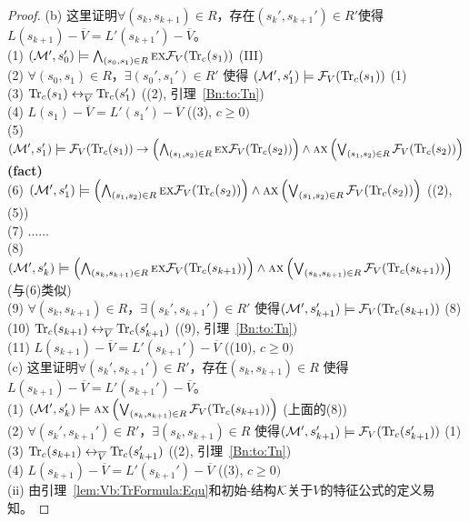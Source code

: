 \begin{proof}
	(b) 这里证明$\forall (s_k, s_{k+1}) \in R$，存在$(s_k', s_{k+1}') \in R'$使得$L(s_{k+1}) - \overline V = L'(s_{k+1}') - \overline V$。\\
	(1) $({\cal M}', s_0') \models \bigwedge_{(s_0, s_1) \in R} \textsc{e} \textsc{x} {\cal F}_V(\textrm{Tr}_c(s_1))$  \hfill  (III)\\
	(2) $\forall (s_0, s_1) \in R$，$\exists (s_0', s_1') \in R'$ 使得 $({\cal M}', s_1') \models {\cal F}_V(\textrm{Tr}_c(s_1))$  \hfill  (1)\\
	(3) $\textrm{Tr}_c(s_1) \leftrightarrow_{\overline V} \textrm{Tr}_c(s_1')$  \hfill  ((2), 引理~\ref{Bn:to:Tn}) \\
	(4) $L(s_1) - \overline V = L'(s_1') - \overline V$  \hfill   ((3), $c \geq 0)$\\
	(5) $({\cal M}', s_1') \models {\cal F}_V(\textrm{Tr}_c(s_1)) \rightarrow \left(\bigwedge_{(s_1,s_2)\in R} \textsc{e} \textsc{x} {\cal F}_V(\textrm{Tr}_c(s_2))\right) \wedge \textsc{a} \textsc{x} \left(\bigvee_{(s_1,s_2)\in R} {\cal F}_V(\textrm{Tr}_c(s_2))\right)$     \hfill  \textbf{(fact)}\\
	(6) $({\cal M}', s_1') \models \left(\bigwedge_{(s_1,s_2)\in R} \textsc{e} \textsc{x} {\cal F}_V(\textrm{Tr}_c(s_2))\right) \wedge \textsc{a} \textsc{x} \left(\bigvee_{(s_1,s_2)\in R} {\cal F}_V(\textrm{Tr}_c(s_2))\right)$ \hfill ((2), (5))\\
	(7) $\dots \dots$ \\
	(8) $({\cal M}', s_k') \models \left(\bigwedge_{(s_k,s_{k+1})\in R} \textsc{e} \textsc{x} {\cal F}_V(\textrm{Tr}_c(s_{k+1}))\right) \wedge \textsc{a} \textsc{x} \left(\bigvee_{(s_k,s_{k+1})\in R} {\cal F}_V(\textrm{Tr}_c(s_{k+1}))\right)$       \hfill (与(6)类似)\\
	(9) $\forall (s_k, s_{k+1}) \in R$，$\exists (s_k', s_{k+1}') \in R'$ 使得$({\cal M}', s_{k+1}') \models {\cal F}_V(\textrm{Tr}_c(s_{k+1}))$  \hfill  (8)\\
	(10) $\textrm{Tr}_c(s_{k+1}) \leftrightarrow_{\overline V} \textrm{Tr}_c(s_{k+1}')$    \hfill ((9), 引理~\ref{Bn:to:Tn}) \\
	(11) $L(s_{k+1}) - \overline V = L'(s_{k+1}') - \overline V$  \hfill   ((10), $c \geq 0)$\\
	
	(c) 这里证明$\forall (s_k', s_{k+1}') \in R'$，存在$(s_k, s_{k+1})\in R$ 使得$L(s_{k+1}) - \overline V = L'(s_{k+1}') - \overline V$。\\
	(1) $({\cal M}', s_k') \models \textsc{a} \textsc{x} \left(\bigvee_{(s_k,s_{k+1})\in R} {\cal F}_V(\textrm{Tr}_c(s_{k+1}))\right)$  \hfill (上面的(8))\\
	(2) $\forall (s_k', s_{k+1}') \in R'$，$\exists (s_k, s_{k+1}) \in R$ 使得$({\cal M}', s_{k+1}') \models {\cal F}_V(\textrm{Tr}_c(s_{k+1}'))$  \hfill (1) \\
	(3) $\textrm{Tr}_c(s_{k+1}) \leftrightarrow_{\overline V} \textrm{Tr}_c(s_{k+1}')$    \hfill ((2), 引理~\ref{Bn:to:Tn}) \\
	(4) $L(s_{k+1}) - \overline V = L'(s_{k+1}') - \overline V$  \hfill   ((3), $c \geq 0)$\\
	
	(ii) 由引理~\ref{lem:Vb:TrFormula:Equ}和初始\MPK-结构${\cal K}$关于$V$的特征公式的定义易知。
	
\end{proof}


